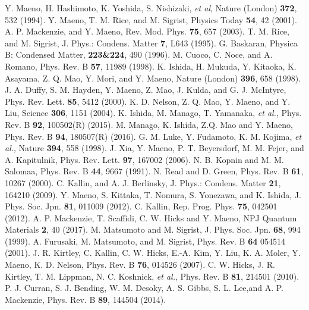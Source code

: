 \documentclass[aps,prl,twocolumn,superscriptaddress,showpacs]{revtex4-1}
\begin{document}
\begin{thebibliography}{99}
 Y. Maeno, H. Hashimoto, K. Yoshida, S. Nishizaki, {\it et al}, Nature (London) {\bf 372}, 532 (1994).
 Y. Maeno, T. M. Rice, and M. Sigrist, Physics Today {\bf 54}, 42 (2001).
 A. P. Mackenzie, and Y. Maeno, Rev. Mod. Phys. {\bf 75}, 657 (2003).
 T. M. Rice, and M. Sigrist, J. Phys.: Condens. Matter {\bf 7}, L643 (1995).
 G. Baskaran, Physica B: Condensed Matter,  {\bf 223\&224}, 490 (1996).
 M. Cuoco, C. Noce, and A. Romano, Phys. Rev. B {\bf 57}, 11989 (1998).
 K. Ishida, H. Mukuda, Y. Kitaoka, K. Asayama, Z. Q. Mao, Y. Mori, and Y. Maeno, Nature (London) {\bf 396}, 658 (1998).
 J. A. Duffy, S. M. Hayden, Y. Maeno, Z. Mao, J. Kulda, and G. J. McIntyre, Phys. Rev. Lett. {\bf 85}, 5412 (2000).
 K. D. Nelson, Z. Q. Mao, Y. Maeno, and Y. Liu, Science {\bf 306}, 1151 (2004).
 K. Ishida, M. Manago, T. Yamanaka, {\it et al.}, Phys. Rev. B {\bf 92}, 100502(R) (2015).
 M. Manago, K. Ishida, Z.Q. Mao and Y. Maeno, Phys. Rev. B {\bf 94}, 180507(R) (2016).
 G. M. Luke, Y. Fudamoto, K. M. Kojima, {\it et al.}, Nature {\bf 394}, 558 (1998).
 J. Xia, Y. Maeno, P. T. Beyersdorf, M. M. Fejer, and A. Kapitulnik, Phys. Rev. Lett. {\bf 97}, 167002 (2006).
 N. B. Kopnin and M. M. Salomaa, Phys. Rev. B {\bf 44}, 9667 (1991).
 N. Read and D. Green, Phys. Rev. B {\bf 61}, 10267 (2000).
 C. Kallin, and A. J. Berlinsky, J. Phys.: Condens. Matter {\bf 21}, 164210 (2009).
 Y. Maeno, S. Kittaka, T. Nomura, S. Yonezawa, and K. Ishida, J. Phys. Soc. Jpn. {\bf 81}, 011009 (2012).
 C. Kallin, Rep. Prog. Phys. {\bf 75}, 042501 (2012).
 A. P. Mackenzie, T. Scaffidi, C. W. Hicks and Y. Maeno, NPJ Quantum Materials {\bf 2}, 40 (2017).
 M. Matsumoto and M. Sigrist, J. Phys. Soc. Jpn. {\bf 68}, 994 (1999).
 A. Furusaki, M. Matsumoto, and M. Sigrist, Phys. Rev. B {\bf 64} 054514 (2001).
 J. R. Kirtley, C. Kallin, C. W. Hicks, E.-A. Kim, Y. Liu, K. A. Moler, Y. Maeno, K. D. Nelson, Phys. Rev. B {\bf 76}, 014526 (2007).
 C. W. Hicks, J. R. Kirtley, T. M. Lippman, N. C. Koshnick, {\it et al.}, Phys. Rev. B {\bf 81}, 214501 (2010).
 P. J. Curran, S. J. Bending, W. M. Desoky, A. S. Gibbs, S. L. Lee,and  A. P. Mackenzie, Phys. Rev. B {\bf 89}, 144504 (2014).

\end{thebibliography}
\end{document}
